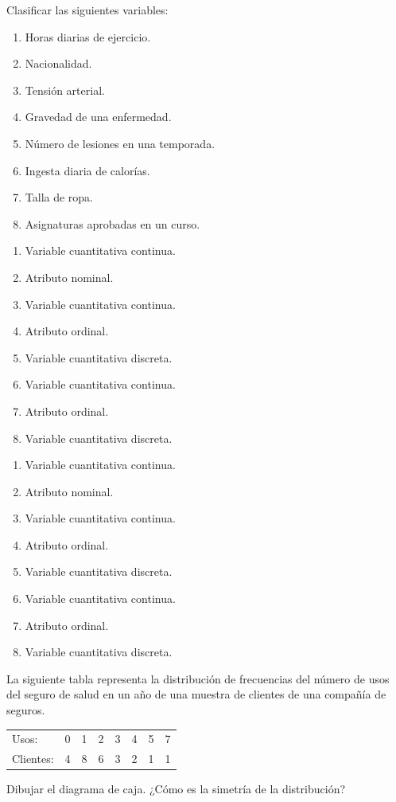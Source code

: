 {Clasificar las siguientes variables:
\begin{enumerate}
\item Horas diarias de ejercicio. 
\item Nacionalidad.
\item Tensión arterial.
\item Gravedad de una enfermedad. 
\item Número de lesiones en una temporada.
\item Ingesta diaria de calorías.
\item Talla de ropa. 
\item Asignaturas aprobadas en un curso.  
\end{enumerate}
}
{\begin{enumerate}
\item Variable cuantitativa continua.
\item Atributo nominal.
\item Variable cuantitativa continua.
\item Atributo ordinal.
\item Variable cuantitativa discreta.
\item Variable cuantitativa continua.
\item Atributo ordinal.
\item Variable cuantitativa discreta.
\end{enumerate}
}
{\begin{enumerate}
\item Variable cuantitativa continua.
\item Atributo nominal.
\item Variable cuantitativa continua.
\item Atributo ordinal.
\item Variable cuantitativa discreta.
\item Variable cuantitativa continua.
\item Atributo ordinal.
\item Variable cuantitativa discreta.
\end{enumerate}
}


{La siguiente tabla representa la distribución de frecuencias del número de usos del seguro de salud en un año de una muestra de clientes de una compañía de seguros.

\begin{center}
\begin{tabular}{lrrrrrrr}
\toprule
Usos: & 0 & 1 & 2 & 3 & 4 & 5 & 7 \\
Clientes: & 4 & 8 & 6 & 3 & 2 & 1 & 1\\
\bottomrule
\end{tabular}
\end{center}

Dibujar el diagrama de caja.
¿Cómo es la simetría de la distribución?
}
{
}
{
}



